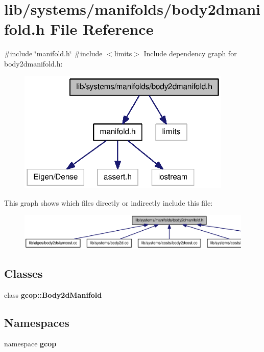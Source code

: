 \section{lib/systems/manifolds/body2dmanifold.h \-File \-Reference}
\label{body2dmanifold_8h}
{\ttfamily \#include \char`\"{}manifold.\-h\char`\"{}}\*
{\ttfamily \#include $<$limits$>$}\*
\-Include dependency graph for body2dmanifold.\-h\-:\nopagebreak
\begin{figure}[H]
\begin{center}
\leavevmode
\includegraphics[width=289pt]{body2dmanifold_8h__incl}
\end{center}
\end{figure}
\-This graph shows which files directly or indirectly include this file\-:\nopagebreak
\begin{figure}[H]
\begin{center}
\leavevmode
\includegraphics[width=350pt]{body2dmanifold_8h__dep__incl}
\end{center}
\end{figure}
\subsection*{\-Classes}
\begin{DoxyCompactItemize}
\item 
class {\bf gcop\-::\-Body2d\-Manifold}
\end{DoxyCompactItemize}
\subsection*{\-Namespaces}
\begin{DoxyCompactItemize}
\item 
namespace {\bf gcop}
\end{DoxyCompactItemize}
